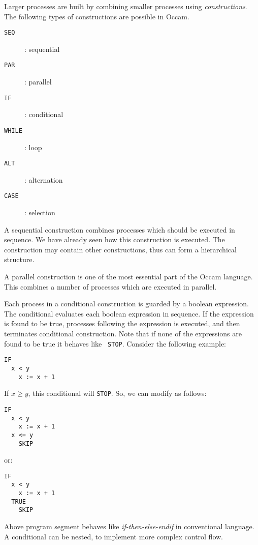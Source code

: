 
Larger processes are built by
combining smaller processes using {\em constructions}.  The following
types of constructions are possible in Occam.
\begin{lin}
\begin{description}
\item[{\tt SEQ}] : sequential
\item[{\tt PAR}] : parallel
\item[{\tt IF}] : conditional
\item[{\tt WHILE}] : loop
\item[{\tt ALT}] : alternation
\item[{\tt CASE}] : selection
\end{description}
\end{lin}

A sequential construction combines processes which should be 
executed in sequence. We
have already seen how this construction is executed.  The construction
may contain other constructions, thus can form a hierarchical
structure.

A parallel construction is one of the most essential part of the
Occam language.  This combines a number of processes which are
executed in parallel.  

Each process in a conditional construction is guarded by a boolean
expression.  The conditional evaluates each boolean expression in
sequence. If the expression is found to be true, processes following the
expression is executed, and then terminates conditional construction.
Note that if
none of the expressions are found to be true it behaves like {\tt
STOP}.  Consider the following example:
\begin{lin}
\begin{verbatim}
IF
  x < y
    x := x + 1
\end{verbatim}
\end{lin}
If $x \geq y$, this conditional will {\tt STOP}.  So, we can modify as
follows:
\begin{lin}
\begin{verbatim}
IF
  x < y
    x := x + 1
  x <= y
    SKIP
\end{verbatim}
\end{lin}
or:
\begin{lin}
\begin{verbatim}
IF
  x < y
    x := x + 1
  TRUE
    SKIP
\end{verbatim}
\end{lin}
Above program segment behaves like {\em if-then-else-endif} in
conventional language.  A conditional can be nested, to implement more
complex control flow.


